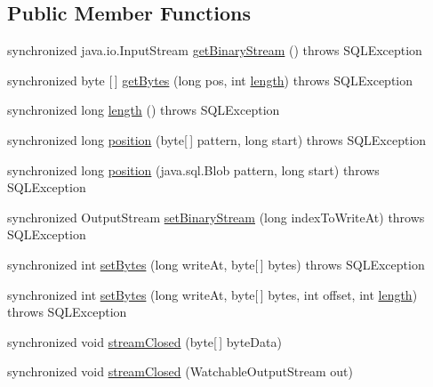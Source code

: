 \subsection*{Public Member Functions}
\begin{DoxyCompactItemize}
\item 
synchronized java.\+io.\+Input\+Stream \mbox{\hyperlink{classcom_1_1mysql_1_1jdbc_1_1_blob_a716c9113195aafa27a5a1f2eb50c230c}{get\+Binary\+Stream}} ()  throws S\+Q\+L\+Exception 
\item 
synchronized byte \mbox{[}$\,$\mbox{]} \mbox{\hyperlink{classcom_1_1mysql_1_1jdbc_1_1_blob_a7553db3605516634189d77a9cdfbac60}{get\+Bytes}} (long pos, int \mbox{\hyperlink{classcom_1_1mysql_1_1jdbc_1_1_blob_aed91f2ff2c2217b4c52294d356253e63}{length}})  throws S\+Q\+L\+Exception 
\item 
synchronized long \mbox{\hyperlink{classcom_1_1mysql_1_1jdbc_1_1_blob_aed91f2ff2c2217b4c52294d356253e63}{length}} ()  throws S\+Q\+L\+Exception 
\item 
synchronized long \mbox{\hyperlink{classcom_1_1mysql_1_1jdbc_1_1_blob_a2559b772dc01c0b327cee87b1a5c119e}{position}} (byte\mbox{[}$\,$\mbox{]} pattern, long start)  throws S\+Q\+L\+Exception 
\item 
synchronized long \mbox{\hyperlink{classcom_1_1mysql_1_1jdbc_1_1_blob_a7ea2c2c3ebb85581cd54c5615e725a88}{position}} (java.\+sql.\+Blob pattern, long start)  throws S\+Q\+L\+Exception 
\item 
synchronized Output\+Stream \mbox{\hyperlink{classcom_1_1mysql_1_1jdbc_1_1_blob_afa722f94370d179ecd4275e8717751a2}{set\+Binary\+Stream}} (long index\+To\+Write\+At)  throws S\+Q\+L\+Exception 
\item 
synchronized int \mbox{\hyperlink{classcom_1_1mysql_1_1jdbc_1_1_blob_a229c3ca9696de0a5d230671e1adea557}{set\+Bytes}} (long write\+At, byte\mbox{[}$\,$\mbox{]} bytes)  throws S\+Q\+L\+Exception 
\item 
synchronized int \mbox{\hyperlink{classcom_1_1mysql_1_1jdbc_1_1_blob_a17fdc870a0ed05ef0d500c874115e3dd}{set\+Bytes}} (long write\+At, byte\mbox{[}$\,$\mbox{]} bytes, int offset, int \mbox{\hyperlink{classcom_1_1mysql_1_1jdbc_1_1_blob_aed91f2ff2c2217b4c52294d356253e63}{length}})  throws S\+Q\+L\+Exception 
\item 
synchronized void \mbox{\hyperlink{classcom_1_1mysql_1_1jdbc_1_1_blob_a8e4bb5f28a7f31220f2817cc8765d8b1}{stream\+Closed}} (byte\mbox{[}$\,$\mbox{]} byte\+Data)
\item 
synchronized void \mbox{\hyperlink{classcom_1_1mysql_1_1jdbc_1_1_blob_a91be83b3b4b6ebf95318f681051065ed}{stream\+Closed}} (Watchable\+Output\+Stream out)

\end{DoxyCompactItemize}

